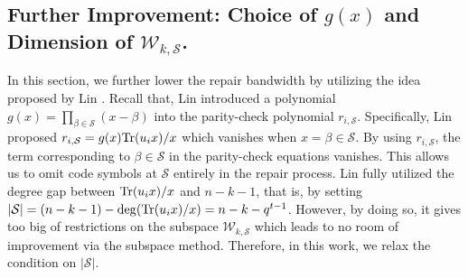 \documentclass[onecolumn]{IEEEtran}
\theoremstyle{plain}
\theoremstyle{definition}
\newcommand{\cS}{\mathcal{S}}
\newcommand{\cW}{\mathcal{W}}
\newcommand{\tr}{{\rm Tr}}
\begin{document}
\subsection{Further Improvement: Choice of $g(x)$ and Dimension of $\cW_{k,\cS}$.}\label{sec:opt}

In this section, we further lower the repair bandwidth by utilizing the idea proposed by Lin \cite{Lin2023}. Recall that, Lin introduced a polynomial $g(x) = \prod_{\beta\in\cS} (x-\beta)$ into the parity-check polynomial $r_{i,\cS}$. Specifically, Lin proposed $r_{i,\cS} = g(x) \tr(u_i x)/x$ which vanishes when $x=\beta\in\cS$. By using $r_{i,\cS}$, the term corresponding to $\beta\in\cS$ in the parity-check equations vanishes. This allows us to omit code symbols at $\cS$ entirely in the repair process. Lin fully utilized the degree gap between $\tr(u_i x)/x$ and $n-k-1$, that is, by setting $|\cS| = (n-k-1) - \deg(\tr(u_i x)/x) = n - k - q^{t-1}$. However, by doing so, it gives too big of restrictions on the subspace $\cW_{k,\cS}$ which leads to no room of improvement via the subspace method. Therefore, in this work, we relax the condition on $|\cS|$.
\end{document}
